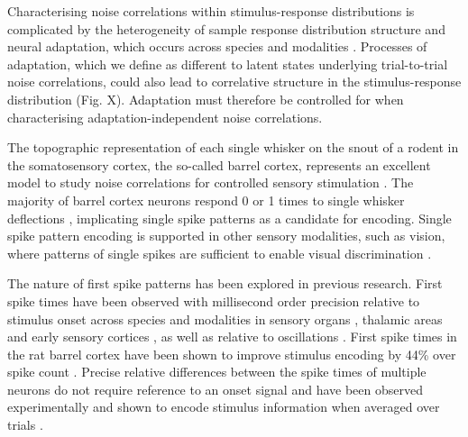 \documentclass{article}
\begin{document}
Characterising noise correlations within stimulus-response distributions is complicated by the heterogeneity of sample response distribution structure and neural adaptation, which occurs across species and modalities \cite{dragoi2002dynamics, ulanovsky2003processing, sharpee2006adaptive}. 
Processes of adaptation, which we define as different to latent states underlying trial-to-trial noise correlations, could also lead to correlative structure in the stimulus-response distribution (Fig. X). Adaptation must therefore be controlled for when characterising adaptation-independent noise correlations.

The topographic representation of each single whisker on the snout of a rodent in the somatosensory cortex, the so-called barrel cortex, represents an excellent model to study noise correlations for controlled sensory stimulation \cite{feldmeyer2013barrel}. 
The majority of barrel cortex neurons respond 0 or 1 times to single whisker deflections \cite{reyes2014laminar}, implicating single spike patterns as a candidate for encoding. Single spike pattern encoding is supported in other sensory modalities, such as vision, where patterns of single spikes are sufficient to enable visual discrimination \cite{resulaj2018first}. 

The nature of first spike patterns has been explored in previous research. First spike times have been observed with millisecond order precision relative to stimulus onset across species and modalities in sensory organs \cite{johansson2004first, uzzell2004precision, gollisch2008rapid}, thalamic areas \cite{reinagel2002precise, storchi2012comparison} and early sensory cortices \cite{reyes2014laminar}, as well as relative to oscillations \cite{havenith2011synchrony}. First spike times in the rat barrel cortex have been shown to improve stimulus encoding by 44\% over spike count \cite{panzeri2001role}. Precise relative differences between the spike times of multiple neurons \cite{izhikevich2006polychronization} do not require reference to an onset signal and have been observed experimentally \cite{johansson2004first, gollisch2008rapid, reyes2014laminar} and shown to encode stimulus information when averaged over trials \cite{gollisch2008rapid}. 
\end{document}
